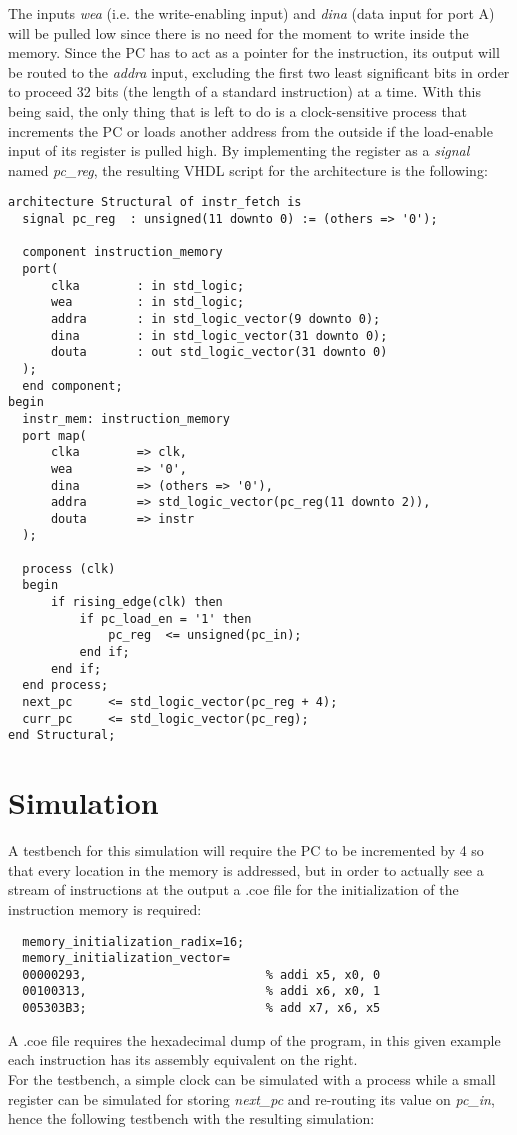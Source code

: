 The inputs \emph{wea} (i.e. the write-enabling input) and \emph{dina} (data input for port A) will be pulled low since there is no need for the moment to write inside the memory. 
Since the PC has to act as a pointer for the instruction, its output will be routed to the \emph{addra} input, excluding the first two least significant bits in order to proceed 32 bits (the length of a standard instruction) at a time.
With this being said, the only thing that is left to do is a clock-sensitive process that increments the PC or loads another address from the outside if the load-enable input of its register is pulled high. 
By implementing the register as a \emph{signal} named \emph{pc{\_}reg}, the resulting VHDL script for the architecture is the following:\\
\begin{verbatim}
architecture Structural of instr_fetch is
  signal pc_reg  : unsigned(11 downto 0) := (others => '0');

  component instruction_memory
  port(
      clka        : in std_logic;
      wea         : in std_logic;
      addra       : in std_logic_vector(9 downto 0);
      dina        : in std_logic_vector(31 downto 0);
      douta       : out std_logic_vector(31 downto 0)
  );
  end component;
begin
  instr_mem: instruction_memory 
  port map(
      clka        => clk,
      wea         => '0',
      dina        => (others => '0'),
      addra       => std_logic_vector(pc_reg(11 downto 2)),
      douta       => instr
  );
  
  process (clk)
  begin
      if rising_edge(clk) then
          if pc_load_en = '1' then
              pc_reg  <= unsigned(pc_in);
          end if;
      end if;
  end process;
  next_pc     <= std_logic_vector(pc_reg + 4);
  curr_pc     <= std_logic_vector(pc_reg);
end Structural;
\end{verbatim}

\section{Simulation}
A testbench for this simulation will require the PC to be incremented by 4 so that every location in the memory is addressed, but in order to actually see a stream of instructions at the output a .coe file for the initialization of the instruction memory is required:

\begin{verbatim}
  memory_initialization_radix=16;
  memory_initialization_vector=
  00000293,                         % addi x5, x0, 0
  00100313,                         % addi x6, x0, 1
  005303B3;                         % add x7, x6, x5
\end{verbatim}
A .coe file requires the hexadecimal dump of the program, in this given example each instruction has its assembly equivalent on the right.\\
For the testbench, a simple clock can be simulated with a process while a small register can be simulated for storing \emph{next{\_}pc} and re-routing its value on \emph{pc{\_}in}, hence the following testbench with the resulting simulation:

